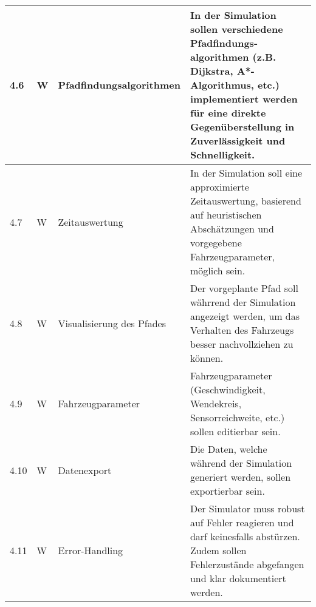 \documentclass[main.tex]{subfiles} %
\begin{document}
\begin{tabular}{|l|p{0.5cm}|p{4cm}|p{10cm}|}
  \hline
  4.6          & W          & Pfadfindungsalgorithmen   & In der Simulation sollen verschiedene Pfadfindungs-algorithmen (z.B. Dijkstra, A*-Algorithmus, etc.) implementiert werden für eine direkte Gegenüberstellung in Zuverlässigkeit und Schnelligkeit. \\
  \hline
  4.7          & W          & Zeitauswertung            & In der Simulation soll eine approximierte Zeitauswertung, basierend auf heuristischen Abschätzungen und vorgegebene Fahrzeugparameter, möglich sein.                                               \\
  \hline
  4.8          & W          & Visualisierung des Pfades & Der vorgeplante Pfad soll währrend der Simulation angezeigt werden, um das Verhalten des Fahrzeugs besser nachvollziehen zu können.                                                                \\
  \hline
  4.9          & W          & Fahrzeugparameter         & Fahrzeugparameter (Geschwindigkeit, Wendekreis, Sensorreichweite, etc.) sollen editierbar sein.                                                                                                    \\
  \hline
  4.10         & W          & Datenexport               & Die Daten, welche während der Simulation generiert werden, sollen exportierbar sein.                                                                                                               \\
  \hline
  4.11         & W          & Error-Handling            & Der Simulator muss robust auf Fehler reagieren und darf keinesfalls abstürzen. Zudem sollen Fehlerzustände abgefangen und klar dokumentiert werden.                                                \\
  \hline
\end{tabular}
\end{document}
